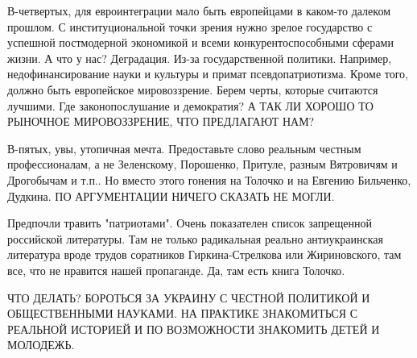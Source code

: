 В-четвертых, для евроинтеграции мало быть европейцами в каком-то далеком
прошлом. С институциональной точки зрения нужно зрелое государство с успешной
постмодерной экономикой  и всеми конкурентоспособными сферами жизни. А что у
нас? Деградация. Из-за государственной политики. Например, недофинансирование
науки и культуры  и примат псевдопатриотизма. Кроме того, должно быть
европейское мировоззрение. Берем черты, которые считаются лучшими. Где
законопослушание и демократия? А ТАК ЛИ ХОРОШО ТО РЫНОЧНОЕ МИРОВОЗЗРЕНИЕ, ЧТО
ПРЕДЛАГАЮТ НАМ?

В-пятых, увы, утопичная мечта. Предоставьте слово реальным честным
профессионалам, а не Зеленскому, Порошенко, Притуле, разным Вятровичям и
Дрогобычам и т.п.. Но вместо этого гонения на Толочко  и на Евгению Бильченко,
Дудкина. ПО АРГУМЕНТАЦИИ НИЧЕГО СКАЗАТЬ НЕ МОГЛИ. 

Предпочли травить "патриотами".  Очень показателен список запрещенной
российской литературы. Там не только радикальная реально антиукраинская
литература вроде трудов соратников Гиркина-Стрелкова или Жириновского, там все,
что не нравится нашей пропаганде. Да, там есть книга Толочко. 

ЧТО ДЕЛАТЬ? БОРОТЬСЯ ЗА УКРАИНУ С ЧЕСТНОЙ ПОЛИТИКОЙ И ОБЩЕСТВЕННЫМИ НАУКАМИ. НА
ПРАКТИКЕ ЗНАКОМИТЬСЯ С РЕАЛЬНОЙ ИСТОРИЕЙ И ПО ВОЗМОЖНОСТИ ЗНАКОМИТЬ ДЕТЕЙ И
МОЛОДЕЖЬ.
